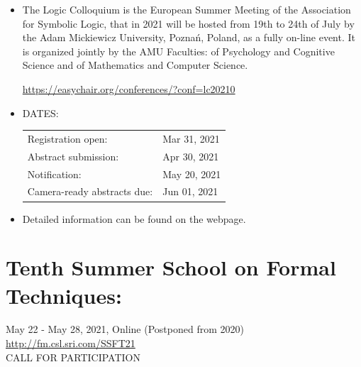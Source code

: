 \documentclass[prodmode,acmtecs]{acmsmall} %
\begin{document}
\begin{itemize}\item  The Logic Colloquium is the European Summer Meeting of the Association for Symbolic Logic, that in 2021 will be hosted from 19th to 24th of July by the Adam Mickiewicz University, Poznań, Poland, as a fully on-line event. It is organized jointly by the AMU Faculties: of Psychology and Cognitive Science and of Mathematics and Computer Science. 
 
  \href{https://easychair.org/conferences/?conf=lc20210}{https://easychair.org/conferences/?conf=lc20210} 
 
\item  DATES: 
 
\begin{tabulary}{\linewidth}{LL}Registration open:  & Mar 31, 2021 \\
Abstract submission:  & Apr 30, 2021 \\
Notification:  & May 20, 2021 \\
Camera-ready abstracts due:  & Jun 01, 2021 \\
\end{tabulary}
 
\item  Detailed information can be found on the webpage. 
 
\end{itemize}\section{Tenth Summer School on Formal Techniques:}\label{TenthSummerSchoolonFormalTechniques} May 22 - May 28, 2021, Online (Postponed from 2020)\\ 
 \href{http://fm.csl.sri.com/SSFT21}{http://fm.csl.sri.com/SSFT21}\\ 
CALL FOR PARTICIPATION 
\end{document}

